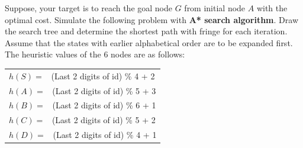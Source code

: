 \vspace{2em}
\begin{Question}[7][CO2 \rgbGray{/} S-23\\S-22]
Suppose, your target is to reach the goal node $G$ from initial node $A$ with the optimal cost. Simulate the following problem with \textbf{A* search algorithm}. Draw the search tree and determine the shortest path with fringe for each iteration. Assume that the states with earlier alphabetical order are to be expanded first. The heuristic values of the 6 nodes are as follows:

\vspace{2em}
\begin{center}
   \begin{minipage}{0.4\textwidth}
      \begin{tabular}{l}
         $h(S) =$ \ (Last 2 digits of id) \% 4 + 2 \\
         $h(A) =$ \ (Last 2 digits of id) \% 5 + 3 \\
         $h(B) =$ \ (Last 2 digits of id) \% 6 + 1 \\
         $h(C) =$ \ (Last 2 digits of id) \% 5 + 2 \\
         $h(D) =$ \ (Last 2 digits of id) \% 4 + 1
      \end{tabular}
   \end{minipage}%
   \begin{minipage}{0.4\textwidth}
   \end{minipage}
\end{center}
\end{Question}

